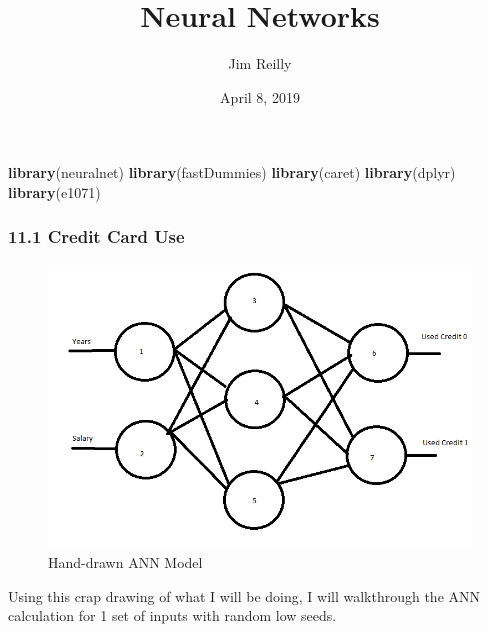 \documentclass[]{article}
\title{Neural Networks}
\author{Jim Reilly}
\date{April 8, 2019}
\newenvironment{Shaded}{\begin{snugshade}}{\end{snugshade}}
\newcommand{\KeywordTok}[1]{\textcolor[rgb]{0.13,0.29,0.53}{\textbf{#1}}}
\newcommand{\NormalTok}[1]{#1}
\begin{document}
\maketitle

\begin{Shaded}
\begin{Highlighting}[]
\KeywordTok{library}\NormalTok{(neuralnet)}
\KeywordTok{library}\NormalTok{(fastDummies)}
\KeywordTok{library}\NormalTok{(caret)}
\KeywordTok{library}\NormalTok{(dplyr)}
\KeywordTok{library}\NormalTok{(e1071)}
\end{Highlighting}
\end{Shaded}

\subsubsection{11.1 Credit Card Use}\label{credit-card-use}

\begin{figure}
\centering
\includegraphics{figures/awful-ann-drawing.png}
\caption{Hand-drawn ANN Model}
\end{figure}

Using this crap drawing of what I will be doing, I will walkthrough the
ANN calculation for 1 set of inputs with random low seeds.
\end{document}
